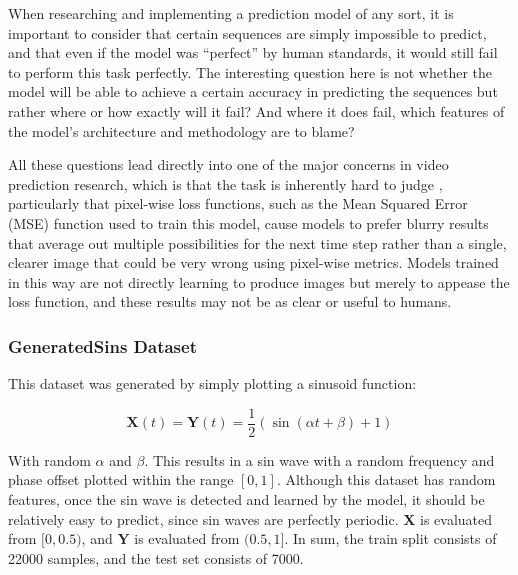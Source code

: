 \documentclass{scrartcl}
\begin{document}
When researching and implementing a prediction model of any sort, it is
important to consider that certain sequences are simply impossible to predict,
and that even if the model was ``perfect'' by human standards, it would still
fail to perform this task perfectly. The interesting question here is not
whether the model will be able to achieve a certain accuracy in predicting the
sequences but rather where or how exactly will it fail? And where it does fail,
which features of the model's architecture and methodology are to blame?

All these questions lead directly into one of the major concerns in video
prediction research, which is that the task is inherently hard to judge
\cite{video_prediction_survey}, particularly that pixel-wise loss functions,
such as the Mean Squared Error (MSE) function used to train this model, cause
models to prefer blurry results that average out multiple possibilities for the
next time step rather than a single, clearer image that could be very wrong
using pixel-wise metrics. Models trained in this way are not directly learning
to produce images but merely to appease the loss function, and these results
may not be as clear or useful to humans.


\subsubsection{GeneratedSins Dataset}
\label{subsubsec:generatedsins_intro}

This dataset was generated by simply plotting a sinusoid function:

\begin{equation}
	\boldsymbol{X} (t) = \boldsymbol{Y} (t) = \frac{1}{2} ( \sin (\alpha t + \beta) + 1)
	\label{eq:generated_sins}
\end{equation}

With random $\alpha$ and $\beta$. This results in a sin wave with a random
frequency and phase offset plotted within the range $[0, 1]$. Although this
dataset has random features, once the sin wave is detected and learned by the
model, it should be relatively easy to predict, since sin waves are perfectly
periodic. $\boldsymbol{X}$ is evaluated from $[0, 0.5)$, and $\boldsymbol{Y}$
is evaluated from $(0.5, 1]$. In sum, the train split consists of 22000
samples, and the test set consists of 7000. 
\end{document}
